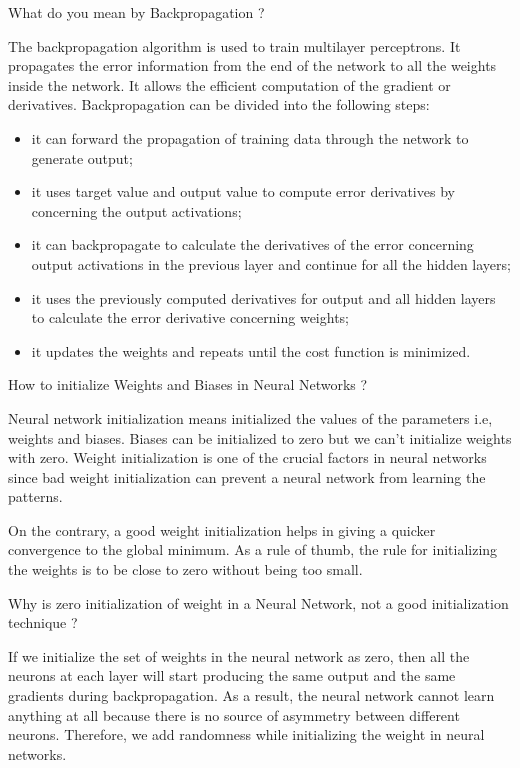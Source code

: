 \documentclass[12pt,a4paper]{exam}
\begin{document}

\question
What do you mean by Backpropagation ?
\fillwithlines{3cm}
\begin{solution}
The backpropagation algorithm is used to train multilayer perceptrons. It propagates the error information from the end of the network to all the weights inside the network. It allows the efficient computation of the gradient or derivatives.
Backpropagation can be divided into the following steps:
\begin{itemize}
\item it can forward the propagation of training data through the network to generate output;
\item it uses target value and output value to compute error derivatives by concerning the output activations;
\item it can backpropagate to calculate the derivatives of the error concerning output activations in the previous layer and continue for all the hidden layers;
\item it uses the previously computed derivatives for output and all hidden layers to calculate the error derivative concerning weights;
\item it updates the weights and repeats until the cost function is minimized.
\end{itemize}
\end{solution}


\question
How to initialize Weights and Biases in Neural Networks ?
\fillwithlines{3cm}
\begin{solution}
Neural network initialization means initialized the values of the parameters i.e, weights and biases. Biases can be initialized to zero but we can’t initialize weights with zero.
Weight initialization is one of the crucial factors in neural networks since bad weight initialization can prevent a neural network from learning the patterns.

On the contrary, a good weight initialization helps in giving a quicker convergence to the global minimum. As a rule of thumb, the rule for initializing the weights is to be close to zero without being too small.
\end{solution}


\question
Why is zero initialization of weight in a Neural Network, not a good initialization technique ?
\fillwithlines{3cm}
\begin{solution}
If we initialize the set of weights in the neural network as zero, then all the neurons at each layer will start producing the same output and the same gradients during backpropagation.
As a result, the neural network cannot learn anything at all because there is no source of asymmetry between different neurons. Therefore, we add randomness while initializing the weight in neural networks.
\end{solution}
\end{document}
